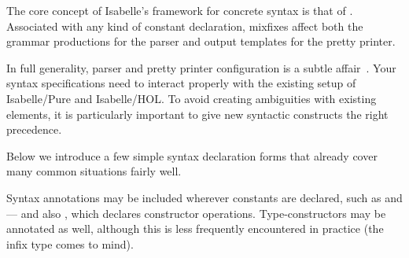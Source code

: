 %
\begin{isabellebody}%
\def\isabellecontext{Documents}%
%
\isadelimtheory
%
\endisadelimtheory
%
\isatagtheory
%
\endisatagtheory
{\isafoldtheory}%
%
\isadelimtheory
%
\endisadelimtheory
%
\isamarkuptrue%
%
\begin{isamarkuptext}%
The core concept of Isabelle's framework for concrete syntax is that
  of .  Associated with any kind of
  constant declaration, mixfixes affect both the grammar productions
  for the parser and output templates for the pretty printer.

  In full generality, parser and pretty printer configuration is a
  subtle affair~\cite{isabelle-ref}.  Your syntax specifications need
  to interact properly with the existing setup of Isabelle/Pure and
  Isabelle/HOL\@.  To avoid creating ambiguities with existing
  elements, it is particularly important to give new syntactic
  constructs the right precedence.

  Below we introduce a few simple syntax declaration
  forms that already cover many common situations fairly well.%
\end{isamarkuptext}%
\isamarkuptrue%
%
\isamarkuptrue%
%
\begin{isamarkuptext}%
Syntax annotations may be included wherever constants are declared,
  such as  and  --- and also
  , which declares constructor operations.
  Type-constructors may be annotated as well, although this is less
  frequently encountered in practice (the infix type  comes
  to mind).


\end{isamarkuptext}
\end{isabellebody}
